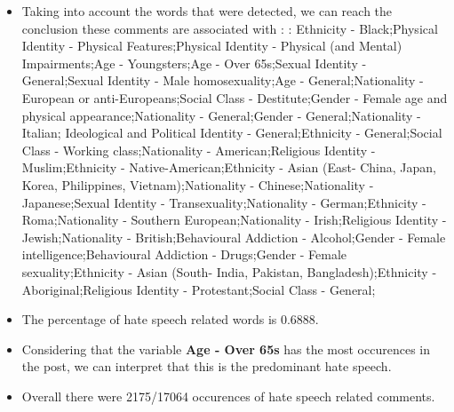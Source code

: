 \documentclass[11pt]{article}
\begin{document}
\begin{itemize}\item Taking into account the words that were detected, we can reach the conclusion these comments are associated with : : Ethnicity - Black;Physical Identity - Physical Features;Physical Identity - Physical (and Mental) Impairments;Age - Youngsters;Age - Over 65s;Sexual Identity - General;Sexual Identity - Male homosexuality;Age - General;Nationality - European or anti-Europeans;Social Class - Destitute;Gender - Female age and physical appearance;Nationality - General;Gender - General;Nationality - Italian; Ideological and Political Identity - General;Ethnicity - General;Social Class - Working class;Nationality - American;Religious Identity - Muslim;Ethnicity - Native-American;Ethnicity - Asian (East- China, Japan, Korea, Philippines, Vietnam);Nationality - Chinese;Nationality - Japanese;Sexual Identity - Transexuality;Nationality - German;Ethnicity - Roma;Nationality - Southern European;Nationality - Irish;Religious Identity - Jewish;Nationality - British;Behavioural Addiction - Alcohol;Gender - Female intelligence;Behavioural Addiction - Drugs;Gender - Female sexuality;Ethnicity - Asian (South- India, Pakistan, Bangladesh);Ethnicity - Aboriginal;Religious Identity - Protestant;Social Class - General;%

\item The percentage of hate speech related words is 0.6888.

\item Considering that the variable \textbf{Age - Over 65s} has the most occurences in the post, we can interpret that this is the predominant hate speech.

\item Overall there were 2175/17064 occurences of hate speech related comments.\end{itemize}
\end{document}
